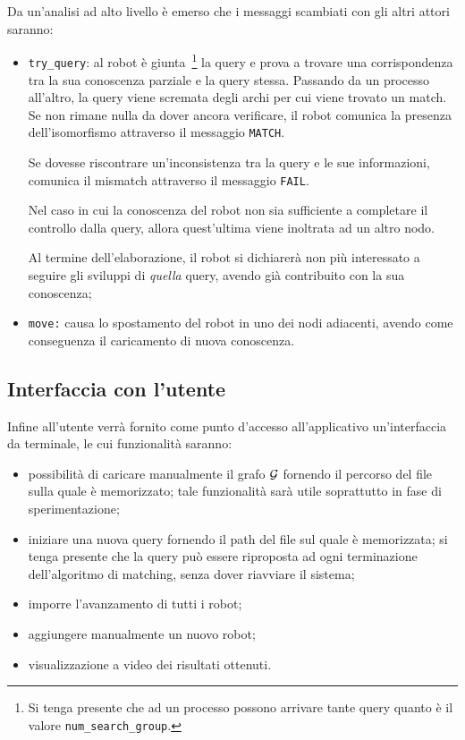 \documentclass{llncs}
\begin{document}
Da un'analisi ad alto livello è emerso che i messaggi scambiati con
gli altri attori saranno:
\begin{itemize}
	\item \texttt{try\_query}: al robot è giunta~\footnote{Si
	tenga presente che ad un processo possono arrivare tante query
	quanto è il valore \texttt{num\_search\_group}.} la query e prova
	a trovare una corrispondenza tra la sua conoscenza parziale e
	la query stessa. Passando da un processo all'altro, la query
	viene scremata degli archi per cui viene trovato un match.
	Se non rimane nulla da dover ancora verificare, il robot comunica la presenza dell'isomorfismo attraverso
	il messaggio \texttt{MATCH}.

	Se dovesse riscontrare un'inconsistenza tra la query e
	le sue informazioni, comunica il mismatch attraverso
	il messaggio \texttt{FAIL}.

	Nel caso in cui la conoscenza del robot non sia sufficiente a completare il controllo
	dalla query, allora quest'ultima viene inoltrata ad un altro nodo.

	Al termine dell'elaborazione, il robot si dichiarerà non più interessato
	a seguire gli sviluppi di \emph{quella} query, avendo già contribuito con la
	sua conoscenza;
	\item \texttt{move:} causa lo spostamento del robot in uno dei
	nodi adiacenti, avendo come conseguenza il caricamento
	di nuova conoscenza.
\end{itemize}

\subsection{Interfaccia con l'utente}
Infine all'utente verrà fornito come punto d'accesso all'applicativo
un'interfaccia da terminale, le cui funzionalità saranno:
\begin{itemize}
	\item possibilità di caricare manualmente il grafo $\mathcal{G}$ fornendo il percorso
	del file sulla quale è memorizzato; tale
	funzionalità sarà utile soprattutto in fase di sperimentazione;
	\item iniziare una nuova query fornendo il path del
	file sul quale è memorizzata; si tenga presente che la query
	può essere riproposta ad ogni terminazione dell'algoritmo di
	matching, senza dover riavviare il sistema;
	\item imporre l'avanzamento di tutti
	i robot;
	\item aggiungere manualmente un nuovo robot;
	\item visualizzazione a video dei risultati ottenuti.
\end{itemize}
\end{document}
